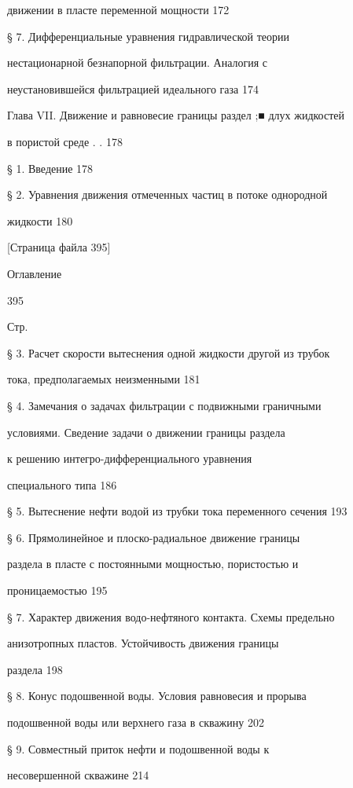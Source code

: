 \documentclass[
  11pt,
]{article}
\begin{document}
движении в пласте переменной мощности 172 \par
§ 7. Дифференциальные уравнения гидравлической теории  \par
нестационарной безнапорной фильтрации. Аналогия с  \par
неустановившейся фильтрацией идеального газа 174 \par
Глава VII. Движение и равновесие границы раздел ;■ длух жидкостей \par
в пористой среде . \textquotesingle. 178 \par
§ 1. Введение 178 \par
§ 2. Уравнения движения отмеченных частиц в потоке однородной \par
жидкости 180 \par
\smallskip
\smallskip
\smallskip
{[}Страница файла 395{]}\par
Оглавление \par
395 \par
Стр. \par
§ 3. Расчет скорости вытеснения одной жидкости другой из трубок \par
тока, предполагаемых неизменными 181 \par
§ 4. Замечания о задачах фильтрации с подвижными граничными \par
условиями. Сведение задачи о движении границы раздела \par
к решению интегро-дифференциального уравнения  \par
специального типа 186 \par
§ 5. Вытеснение нефти водой из трубки тока переменного сечения 193 \par
§ 6. Прямолинейное и плоско-радиальное движение границы  \par
раздела в пласте с постоянными мощностью, пористостью и  \par
проницаемостью 195 \par
§ 7. Характер движения водо-нефтяного контакта. Схемы предельно \par
анизотропных пластов. Устойчивость движения границы \par
раздела 198 \par
§ 8. Конус подошвенной воды. Условия равновесия и прорыва \par
подошвенной воды или верхнего газа в скважину 202 \par
§ 9. Совместный приток нефти и подошвенной воды к  \par
несовершенной скважине 214 \par
\end{document}

